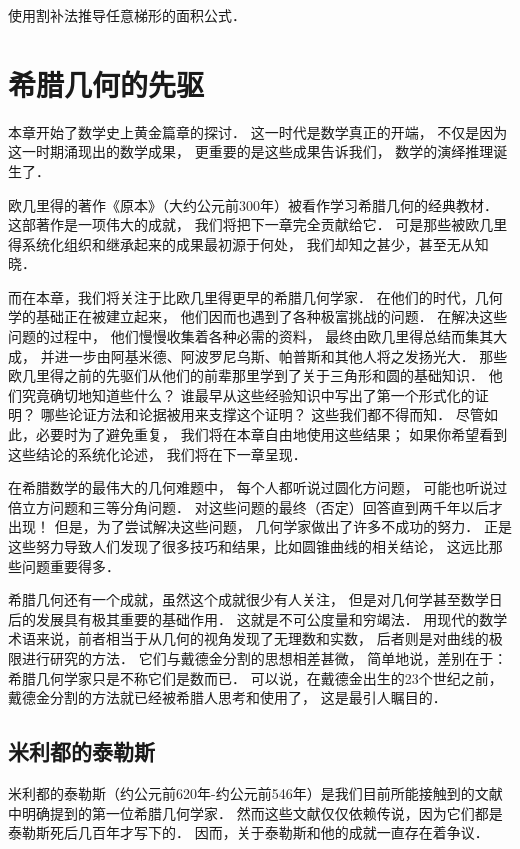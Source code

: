 \documentclass[cn,fancy,blue,11pt]{elegantbook}
\begin{document}
\begin{exercise}
	使用割补法推导任意梯形的面积公式．
\end{exercise}

\chapter{希腊几何的先驱}

本章开始了数学史上黄金篇章的探讨．
这一时代是数学真正的开端，
不仅是因为这一时期涌现出的数学成果，
更重要的是这些成果告诉我们，
数学的演绎推理诞生了．

欧几里得的著作《原本》（大约公元前300年）被看作学习希腊几何的经典教材．
这部著作是一项伟大的成就，
我们将把下一章完全贡献给它．
可是那些被欧几里得系统化组织和继承起来的成果最初源于何处，
我们却知之甚少，甚至无从知晓．

而在本章，我们将关注于比欧几里得更早的希腊几何学家．
在他们的时代，几何学的基础正在被建立起来，
他们因而也遇到了各种极富挑战的问题．
在解决这些问题的过程中，
他们慢慢收集着各种必需的资料，
最终由欧几里得总结而集其大成，
并进一步由阿基米德、阿波罗尼乌斯、帕普斯和其他人将之发扬光大．
那些欧几里得之前的先驱们从他们的前辈那里学到了关于三角形和圆的基础知识．
他们究竟确切地知道些什么？
谁最早从这些经验知识中写出了第一个形式化的证明？
哪些论证方法和论据被用来支撑这个证明？
这些我们都不得而知．
尽管如此，必要时为了避免重复，
我们将在本章自由地使用这些结果；
如果你希望看到这些结论的系统化论述，
我们将在下一章呈现．

在希腊数学的最伟大的几何难题中，
每个人都听说过圆化方问题，
可能也听说过倍立方问题和三等分角问题．
对这些问题的最终（否定）回答直到两千年以后才出现！
但是，为了尝试解决这些问题，
几何学家做出了许多不成功的努力．
正是这些努力导致人们发现了很多技巧和结果，比如圆锥曲线的相关结论，
这远比那些问题重要得多．

希腊几何还有一个成就，虽然这个成就很少有人关注，
但是对几何学甚至数学日后的发展具有极其重要的基础作用．
这就是不可公度量和穷竭法．
用现代的数学术语来说，前者相当于从几何的视角发现了无理数和实数，
后者则是对曲线的极限进行研究的方法．
它们与戴德金分割的思想相差甚微，
简单地说，差别在于：希腊几何学家只是不称它们是数而已．
可以说，在戴德金出生的23个世纪之前，
戴德金分割的方法就已经被希腊人思考和使用了，
这是最引人瞩目的．

\section{米利都的泰勒斯}

米利都的泰勒斯（约公元前620年-约公元前546年）是我们目前所能接触到的文献中明确提到的第一位希腊几何学家．
然而这些文献仅仅依赖传说，因为它们都是泰勒斯死后几百年才写下的．
因而，关于泰勒斯和他的成就一直存在着争议．
\end{document}

